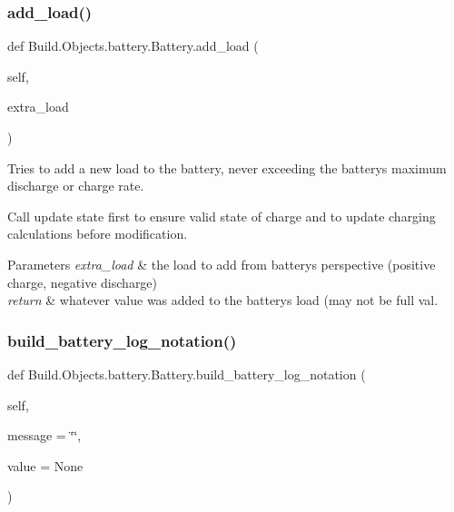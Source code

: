 \subsubsection{\texorpdfstring{add\+\_\+load()}{add\_load()}}
{\footnotesize\ttfamily def Build.\+Objects.\+battery.\+Battery.\+add\+\_\+load (\begin{DoxyParamCaption}\item[{}]{self,  }\item[{}]{extra\+\_\+load }\end{DoxyParamCaption})}



Tries to add a new load to the battery, never exceeding the battery\textquotesingle{}s maximum discharge or charge rate. 

Call update state first to ensure valid state of charge and to update charging calculations before modification. 
\begin{DoxyParams}{Parameters}
{\em extra\+\_\+load} & the load to add from battery\textquotesingle{}s perspective (positive charge, negative discharge) \\
\hline
{\em return} & whatever value was added to the battery\textquotesingle{}s load (may not be full val. \\
\hline
\end{DoxyParams}
\mbox{\label{class_build_1_1_objects_1_1battery_1_1_battery_aa4838ab445d5c20f9c27752ffc911c6e}} 
\subsubsection{\texorpdfstring{build\+\_\+battery\+\_\+log\+\_\+notation()}{build\_battery\_log\_notation()}}
{\footnotesize\ttfamily def Build.\+Objects.\+battery.\+Battery.\+build\+\_\+battery\+\_\+log\+\_\+notation (\begin{DoxyParamCaption}\item[{}]{self,  }\item[{}]{message = {\ttfamily \char`\"{}\char`\"{}},  }\item[{}]{value = {\ttfamily None} }\end{DoxyParamCaption})}



